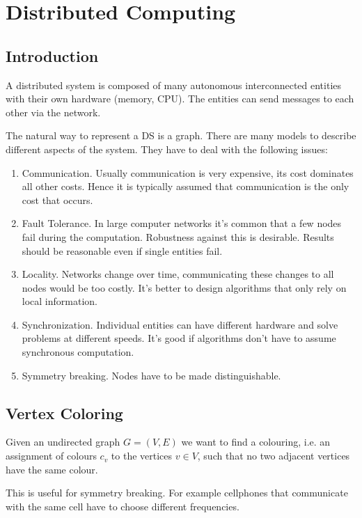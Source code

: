 \chapter{Distributed Computing}

\section{Introduction}

A distributed system is composed of many autonomous interconnected entities with their own hardware (memory, CPU). The entities can send messages to each other via the network.

The natural way to represent a DS is a graph. There are many models to describe different aspects of the system. They have to deal with the following issues:

\begin{enumerate}
\item Communication. Usually communication is very expensive, its cost dominates all other costs. Hence it is typically assumed that communication is the only cost that occurs.
\item Fault Tolerance. In large computer networks it's common that a few nodes fail during the computation. Robustness against this is desirable. Results should be reasonable even if single entities fail.
\item Locality. Networks change over time, communicating these changes to all nodes would be too costly. It's better to design algorithms that only rely on local information.
\item Synchronization. Individual entities can have different hardware and solve problems at different speeds. It's good if algorithms don't have to assume synchronous computation.
\item Symmetry breaking. Nodes have to be made distinguishable.
\end{enumerate}

\section{Vertex Coloring}

Given an undirected graph $G=(V,E)$ we want to find a colouring, i.e. an assignment of colours $c_v$ to the vertices $v\in V$, such that no two adjacent vertices have the same colour.

This is useful for symmetry breaking. For example cellphones that communicate with the same cell have to choose different frequencies.

